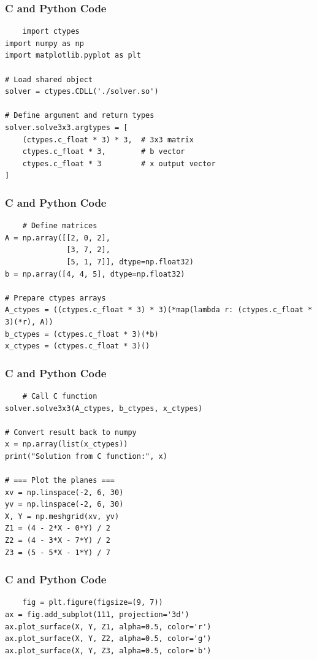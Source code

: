 \documentclass{beamer}
\begin{document}
\begin{frame}[fragile]
\frametitle{C and Python Code}
\begin{lstlisting}
    import ctypes
import numpy as np
import matplotlib.pyplot as plt

# Load shared object
solver = ctypes.CDLL('./solver.so')

# Define argument and return types
solver.solve3x3.argtypes = [
    (ctypes.c_float * 3) * 3,  # 3x3 matrix
    ctypes.c_float * 3,        # b vector
    ctypes.c_float * 3         # x output vector
]

\end{lstlisting}
\end{frame}
\begin{frame}[fragile]
\frametitle{C and Python Code}
\begin{lstlisting}
    # Define matrices
A = np.array([[2, 0, 2],
              [3, 7, 2],
              [5, 1, 7]], dtype=np.float32)
b = np.array([4, 4, 5], dtype=np.float32)

# Prepare ctypes arrays
A_ctypes = ((ctypes.c_float * 3) * 3)(*map(lambda r: (ctypes.c_float * 3)(*r), A))
b_ctypes = (ctypes.c_float * 3)(*b)
x_ctypes = (ctypes.c_float * 3)()

\end{lstlisting}
\end{frame}
\begin{frame}[fragile]
\frametitle{C and Python Code}
\begin{lstlisting}
    # Call C function
solver.solve3x3(A_ctypes, b_ctypes, x_ctypes)

# Convert result back to numpy
x = np.array(list(x_ctypes))
print("Solution from C function:", x)

# === Plot the planes ===
xv = np.linspace(-2, 6, 30)
yv = np.linspace(-2, 6, 30)
X, Y = np.meshgrid(xv, yv)
Z1 = (4 - 2*X - 0*Y) / 2
Z2 = (4 - 3*X - 7*Y) / 2
Z3 = (5 - 5*X - 1*Y) / 7
\end{lstlisting}
\end{frame}
\begin{frame}[fragile]
\frametitle{C and Python Code}
\begin{lstlisting}
    fig = plt.figure(figsize=(9, 7))
ax = fig.add_subplot(111, projection='3d')
ax.plot_surface(X, Y, Z1, alpha=0.5, color='r')
ax.plot_surface(X, Y, Z2, alpha=0.5, color='g')
ax.plot_surface(X, Y, Z3, alpha=0.5, color='b')

\end{lstlisting}
\end{frame}
\end{document}
